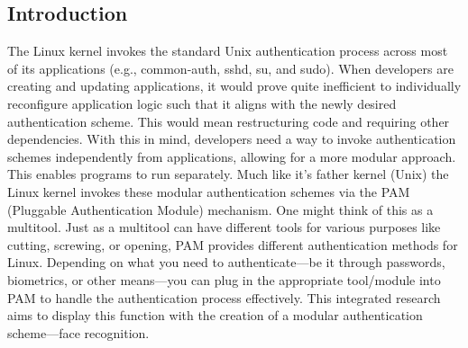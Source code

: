 \documentclass[
]{article}
\begin{document}
\begin{multicols}{2}
\section{Introduction}
The Linux kernel invokes the standard Unix authentication process across most of its applications (e.g., common-auth, sshd, su, and sudo). When developers are creating and updating applications, it would prove quite inefficient to individually reconfigure application logic such that it aligns with the newly desired authentication scheme. This would mean restructuring code and requiring other dependencies. With this in mind, developers need a way to invoke authentication schemes independently from applications, allowing for a more modular approach. This enables programs to run separately. Much like it's father kernel (Unix) the Linux kernel invokes these modular authentication schemes via the PAM (Pluggable Authentication Module) mechanism. One might think of this as a multitool. Just as a multitool can have different tools for various purposes like cutting, screwing, or opening, PAM provides different authentication methods for Linux. Depending on what you need to authenticate—be it through passwords, biometrics, or other means—you can plug in the appropriate tool/module into PAM to handle the authentication process effectively. This integrated research aims to display this function with the creation of a modular authentication scheme—face recognition.


\end{multicols}
\end{document}
